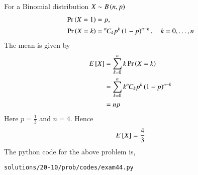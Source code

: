 For a Binomial distribution $X \sim B\left(n,p\right)$
\begin{align}
\Pr\left(X = 1\right) &= p,
\\
\Pr\left(X = k\right) &= {{}^{n}\mkern-1muC_{k}}p^k\left(1-p\right)^{n-k}, \quad k = 0,\dots, n
\label{eq:exam44_1}
\end{align}
The mean is given by 
\begin{align}
E{}\left[X\right]&=\sum_{k=0}^{n} k \Pr\left(X=k\right)
\\
&=\sum_{k=0}^{n} k {{}^{n}\mkern-1muC_{k}}p^k \left(1-p\right)^{n-k}
\\
&=np
\end{align}
Here $p=\frac{1}{3}$ and $n=4$.  Hence
\begin{align}
E{}\left[X\right] = \frac{4}{3}
\end{align}
The python code for the above problem is,
\begin{lstlisting}
solutions/20-10/prob/codes/exam44.py
\end{lstlisting}
